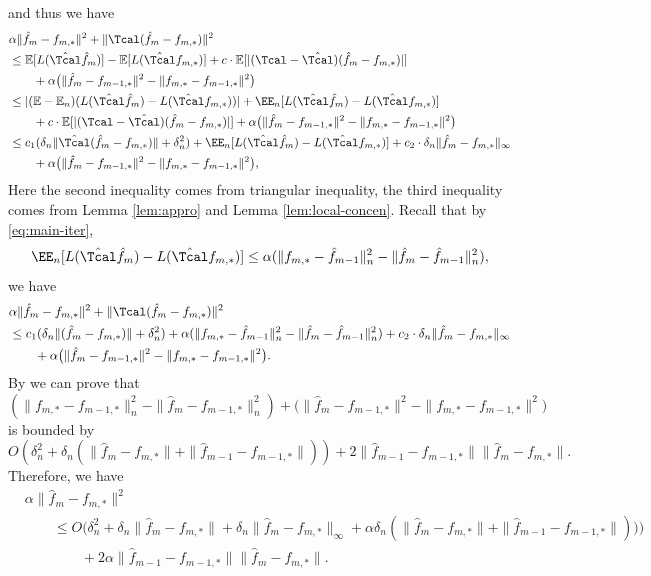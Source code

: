 \documentclass[12pt]{extarticle} %
\begin{document}
and thus we have \begin{align*}
&\alpha \|\hat{f}_m - f_{m,*}\|^2 + \|\Tcal(\hat{f}_m - f_{m,*})\|^2\\
    & \leq \mathbb{E}[L(\hat{\Tcal}\hat{f}_m)] - \mathbb{E}[L(\hat{\Tcal} f_{m,*})] + c\cdot\mathbb{E}[|(\Tcal - \hat{\Tcal})(\hat{f}_m - f_{m,*})|]\\
    &\qquad+ \alpha\big(\|\hat{f}_m - f_{m-1,*}\|^2 - \|f_{m,*} - f_{m-1,*}\|^2\big)\\
    & \leq |(\mathbb{E} - \mathbb{E}_n)(L(\hat{\Tcal}\hat{f}_m) - L(\hat{\Tcal} f_{m,*}) )| + \EE_n[L(\hat{\Tcal}\hat{f}_m) - L(\hat{\Tcal} f_{m,*})] \\
    &\qquad+ c\cdot\mathbb{E}[|(\Tcal - \hat{\Tcal})(\hat{f}_m - f_{m,*})|] +  \alpha\big(\|\hat{f}_m - f_{m-1,*}\|^2 - \|f_{m,*} - f_{m-1,*}\|^2\big)\\
    &\leq c_1 (\delta_n\|\hat{\Tcal}(\hat{f}_m - f_{m,*})\| + \delta_n^2)+ \EE_n[L(\hat{\Tcal}\hat{f}_m) - L(\hat{\Tcal} f_{m,*})] + c_2\cdot\delta_n \|\hat{f}_m - f_{m,*}\|_\infty \\
    &\qquad +  \alpha\big(\|\hat{f}_m - f_{m-1,*}\|^2 - \|f_{m,*} - f_{m-1,*}\|^2\big),\\
\end{align*}
Here the second inequality comes from triangular inequality, the third inequality comes from Lemma \ref{lem:appro} and Lemma \ref{lem:local-concen}.
Recall that by \eqref{eq:main-iter},  $$
 \EE_n[L(\hat{\Tcal}\hat{f}_m) - L(\hat{\Tcal} f_{m,*})] \leq  \alpha(\|f_{m,*} - \hat{f}_{m-1}\|^2_n - \|\hat{f}_m - \hat{f}_{m-1}\|^2_n),
$$
we have \begin{align*}
&\alpha \|\hat{f}_m - f_{m,*}\|^2 + \|\Tcal(\hat{f}_m - f_{m,*})\|^2\\
&\leq c_1 (\delta_n\|(\hat{f}_m - f_{m,*})\| + \delta_n^2) + \alpha(\|f_{m,*} - \hat{f}_{m-1}\|^2_n - \|\hat{f}_m - \hat{f}_{m-1}\|^2_n) + c_2\cdot\delta_n \|\hat{f}_m - f_{m,*}\|_\infty \\
&\qquad +  \alpha\big(\|\hat{f}_m - f_{m-1,*}\|^2 - \|f_{m,*} - f_{m-1,*}\|^2\big).
\end{align*}
By \cite{bennett2023source} we can prove that $$
(\|f_{m,*} - f_{m-1,*}\|^2_n - \|\hat{f}_m - f_{m-1,*}\|^2_n) +\big(\|\hat{f}_m - f_{m-1,*}\|^2 - \|f_{m,*} - f_{m-1,*}\|^2\big)
$$
is bounded by $$O(\delta_n^2 + \delta_n(\|\hat{f}_m - f_{m,*}\| + \|\hat{f}_{m-1} - f_{m-1,*}\|)) + 2\|\hat{f}_{m-1} - f_{m-1,*}\|\|\hat{f}_{m} - f_{m,*}\|.$$ 
Therefore, we have \begin{align*}
    &\alpha \|\hat{f}_m - f_{m,*}\|^2 \\
    &\qquad\leq O\bigg(\delta_n^2 + \delta_n\|\hat{f}_m - f_{m,*}\| + \delta_n\|\hat{f}_m - f_{m,*}\|_\infty + \alpha\delta_n(\|\hat{f}_m - f_{m,*}\| + \|\hat{f}_{m-1} - f_{m-1,*}\|))\bigg)\\
    &\qquad\qquad + 2\alpha\|\hat{f}_{m-1} - f_{m-1,*}\|\|\hat{f}_{m} - f_{m,*}\|.
\end{align*}
\end{document}
